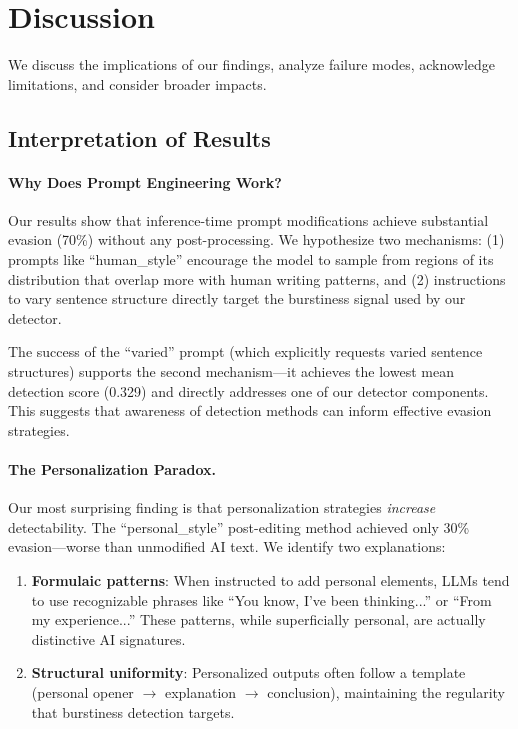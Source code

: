 \section{Discussion}
\label{sec:discussion}

We discuss the implications of our findings, analyze failure modes, acknowledge limitations, and consider broader impacts.

\subsection{Interpretation of Results}

\paragraph{Why Does Prompt Engineering Work?} Our results show that inference-time prompt modifications achieve substantial evasion (70\%) without any post-processing. We hypothesize two mechanisms: (1) prompts like ``human\_style'' encourage the model to sample from regions of its distribution that overlap more with human writing patterns, and (2) instructions to vary sentence structure directly target the burstiness signal used by our detector.

The success of the ``varied'' prompt (which explicitly requests varied sentence structures) supports the second mechanism---it achieves the lowest mean detection score (0.329) and directly addresses one of our detector components. This suggests that awareness of detection methods can inform effective evasion strategies.

\paragraph{The Personalization Paradox.} Our most surprising finding is that personalization strategies \textit{increase} detectability. The ``personal\_style'' post-editing method achieved only 30\% evasion---worse than unmodified AI text. We identify two explanations:

\begin{enumerate}
    \item \textbf{Formulaic patterns}: When instructed to add personal elements, LLMs tend to use recognizable phrases like ``You know, I've been thinking...'' or ``From my experience...'' These patterns, while superficially personal, are actually distinctive AI signatures.

    \item \textbf{Structural uniformity}: Personalized outputs often follow a template (personal opener $\rightarrow$ explanation $\rightarrow$ conclusion), maintaining the regularity that burstiness detection targets.
\end{enumerate}

